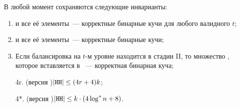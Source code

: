 \begin{theorem} \label{th:invar}
В любой момент сохраняются следующие инварианты:
\begin{enumerate}
\item \MH[t] и все её элементы~--- корректные бинарные кучи для любого валидного $t$;
\item \HH и все её элементы~--- корректные бинарные кучи;
\item Если балансировка на $t$-м уровне находится в стадии II, то множество , которое
вставляется в \MH[t+1]~--- корректная бинарная куча;
\item[4r.] (версия {\CH[r]})\quad $|\texttt{HH}| \leq (4r+4)k$;
\item[4*.] (версия {\CH[*]})\quad $|\texttt{HH}| \leq k\cdot (4 \log^* n + 8)$.
\addtocounter{enumi}{-1}
\end{enumerate}
\end{theorem}
